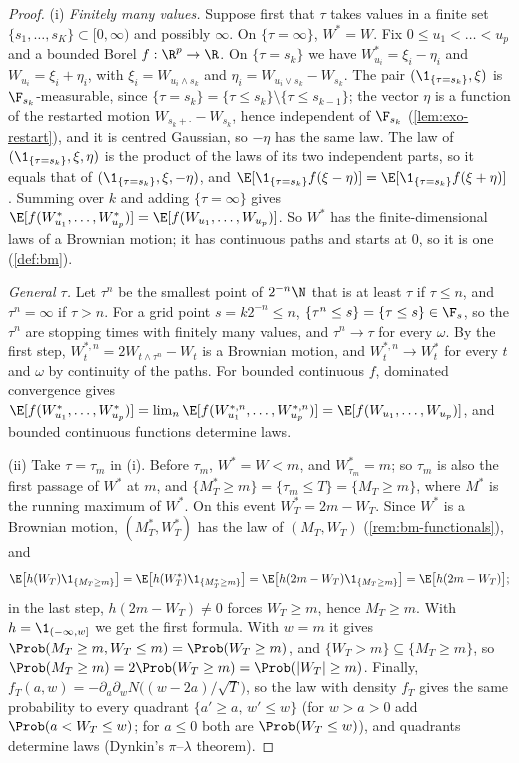 \begin{proof}
(i) \emph{Finitely many values.} Suppose first that $\tau$ takes values in a finite set
$\{s_1,\dots,s_K\}\subset[0,\infty)$ and possibly $\infty$. On $\{\tau=\infty\}$, $W^*=W$. Fix
$0\le u_1<\dots<u_p$ and a bounded Borel $f:\R^p\to\R$. On $\{\tau=s_k\}$ we have
$W^*_{u_i}=\xi_i-\eta_i$ and $W_{u_i}=\xi_i+\eta_i$, with $\xi_i=W_{u_i\wedge s_k}$ and
$\eta_i=W_{u_i\vee s_k}-W_{s_k}$. The pair $(\1_{\{\tau=s_k\}},\xi)$ is $\F_{s_k}$-measurable,
since $\{\tau=s_k\}=\{\tau\le s_k\}\setminus\{\tau\le s_{k-1}\}$; the vector $\eta$ is a function
of the restarted motion $W_{s_k+\cdot}-W_{s_k}$, hence independent of $\F_{s_k}$
(\cref{lem:exo-restart}), and it is centred Gaussian, so $-\eta$ has the same law. The law of
$(\1_{\{\tau=s_k\}},\xi,\eta)$ is the product of the laws of its two independent parts, so it
equals that of $(\1_{\{\tau=s_k\}},\xi,-\eta)$, and
$\E[\1_{\{\tau=s_k\}}f(\xi-\eta)]=\E[\1_{\{\tau=s_k\}}f(\xi+\eta)]$. Summing over $k$ and adding
$\{\tau=\infty\}$ gives $\E[f(W^*_{u_1},\dots,W^*_{u_p})]=\E[f(W_{u_1},\dots,W_{u_p})]$. So $W^*$
has the finite-dimensional laws of a Brownian motion; it has continuous paths and starts at
$0$, so it is one (\cref{def:bm}).

\emph{General $\tau$.} Let $\tau^n$ be the smallest point of $2^{-n}\N$ that is at least
$\tau$ if $\tau\le n$, and $\tau^n=\infty$ if $\tau>n$. For a grid point $s=k2^{-n}\le n$,
$\{\tau^n\le s\}=\{\tau\le s\}\in\F_s$, so the $\tau^n$ are stopping times with finitely many
values, and $\tau^n\to\tau$ for every $\omega$. By the first step,
$W^{*,n}_t=2W_{t\wedge\tau^n}-W_t$ is a Brownian motion, and $W^{*,n}_t\to W^*_t$ for every $t$
and $\omega$ by continuity of the paths. For bounded continuous $f$, dominated convergence
gives $\E[f(W^*_{u_1},\dots,W^*_{u_p})]=\lim_n\E[f(W^{*,n}_{u_1},\dots,W^{*,n}_{u_p})]
=\E[f(W_{u_1},\dots,W_{u_p})]$, and bounded continuous functions determine laws.

(ii) Take $\tau=\tau_m$ in (i). Before $\tau_m$, $W^*=W<m$, and $W^*_{\tau_m}=m$; so $\tau_m$ is also
the first passage of $W^*$ at $m$, and $\{M^*_T\ge m\}=\{\tau_m\le T\}=\{M_T\ge m\}$, where $M^*$ is
the running maximum of $W^*$. On this event $W^*_T=2m-W_T$. Since $W^*$ is a Brownian motion,
$(M^*_T,W^*_T)$ has the law of $(M_T,W_T)$ (\cref{rem:bm-functionals}), and
\[
  \E\big[h(W_T)\1_{\{M_T\ge m\}}\big]=\E\big[h(W^*_T)\1_{\{M^*_T\ge m\}}\big]
  =\E\big[h(2m-W_T)\1_{\{M_T\ge m\}}\big]=\E\big[h(2m-W_T)\big];
\]
in the last step, $h(2m-W_T)\ne0$ forces $W_T\ge m$, hence $M_T\ge m$. With $h=\1_{(-\infty,w]}$
we get the first formula. With $w=m$ it gives $\Prob(M_T\ge m,W_T\le m)=\Prob(W_T\ge m)$, and
$\{W_T>m\}\subseteq\{M_T\ge m\}$, so $\Prob(M_T\ge m)=2\Prob(W_T\ge m)=\Prob(|W_T|\ge m)$. Finally,
$f_T(a,w)=-\partial_a\partial_wN\big((w-2a)/\sqrt T\big)$, so the law with density $f_T$ gives the same
probability to every quadrant $\{a'\ge a,\,w'\le w\}$ (for $w>a>0$ add $\Prob(a<W_T\le w)$; for $a\le0$
both are $\Prob(W_T\le w)$), and quadrants determine laws (Dynkin's $\pi$--$\lambda$ theorem).


\end{proof}
